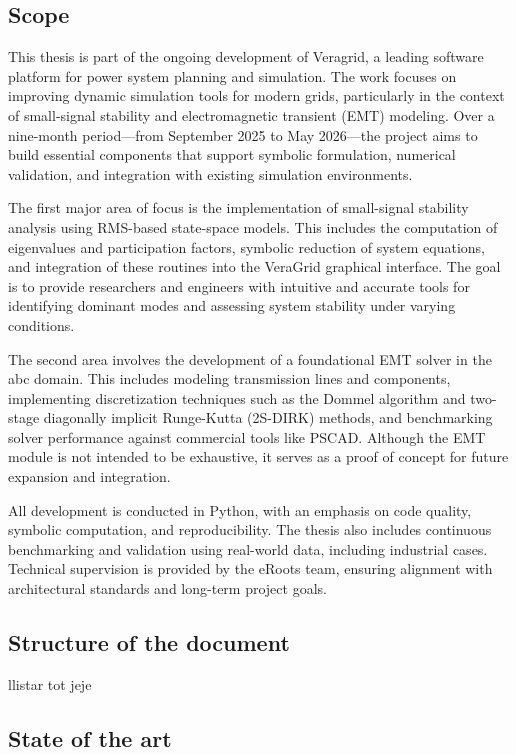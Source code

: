 \subsection{Scope}

This thesis is part of the ongoing development of Veragrid, a leading software platform for power system planning and simulation. 
The work focuses on improving dynamic simulation tools for modern grids, particularly in the context of small-signal stability and electromagnetic transient (EMT) modeling.
Over a nine-month period—from September 2025 to May 2026—the project aims to build essential components that support symbolic formulation, numerical validation,
 and integration with existing simulation environments. 

The first major area of focus is the implementation of small-signal stability analysis using RMS-based state-space models.
This includes the computation of eigenvalues and participation factors, symbolic reduction of system equations,
 and integration of these routines into the VeraGrid graphical interface.
  The goal is to provide researchers and engineers with intuitive and accurate tools for identifying dominant modes and assessing system stability under varying conditions.

The second area involves the development of a foundational EMT solver in the abc domain. This includes modeling transmission lines and components,
 implementing discretization techniques such as the Dommel algorithm and two-stage diagonally implicit Runge-Kutta (2S-DIRK) methods,
  and benchmarking solver performance against commercial tools like PSCAD. Although the EMT module is not intended to be exhaustive,
   it serves as a proof of concept for future expansion and integration.

All development is conducted in Python, with an emphasis on code quality, symbolic computation, and reproducibility.
 The thesis also includes continuous benchmarking and validation using real-world data, including industrial cases.
  Technical supervision is provided by the eRoots team, ensuring alignment with architectural standards and long-term project goals.

\subsection{Structure of the document}

llistar tot jeje

\subsection{State of the art}

